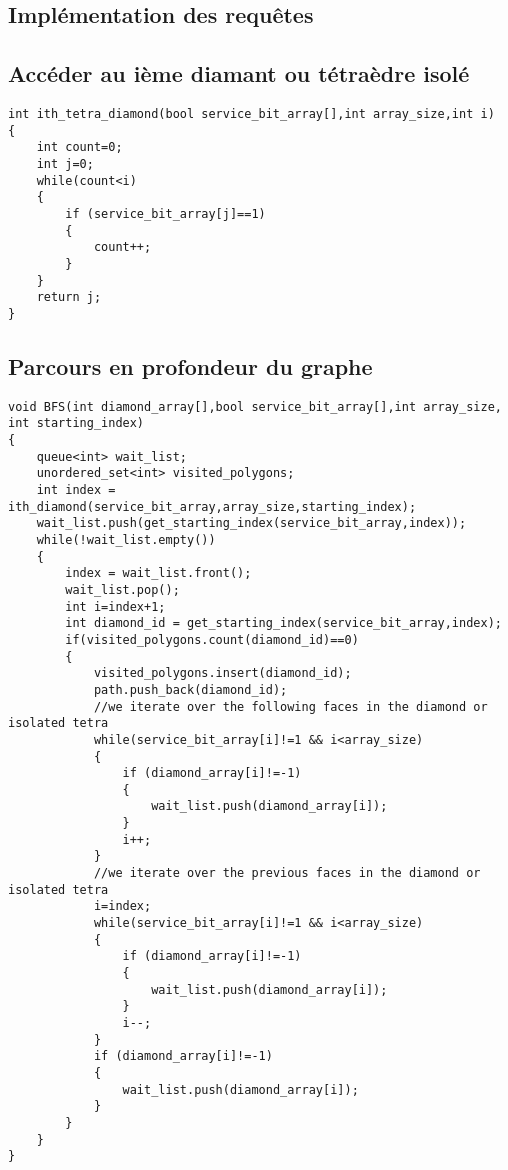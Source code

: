 \documentclass[a4paper,11pt,openany]{article}
\begin{document}
\newpage
\begin{appendices}
\section{Implémentation des requêtes}
\subsection{Accéder au ième diamant ou tétraèdre isolé}
\begin{lstlisting}
int ith_tetra_diamond(bool service_bit_array[],int array_size,int i)
{
    int count=0;
    int j=0;
    while(count<i)
    {
    	if (service_bit_array[j]==1)
    	{
    		count++;
    	}
    }
    return j;
}
\end{lstlisting}
\subsection{Parcours en profondeur du graphe}
\begin{lstlisting}
void BFS(int diamond_array[],bool service_bit_array[],int array_size,
int starting_index)
{
    queue<int> wait_list;
    unordered_set<int> visited_polygons; 
    int index = ith_diamond(service_bit_array,array_size,starting_index);    
    wait_list.push(get_starting_index(service_bit_array,index)); 
    while(!wait_list.empty())
    {
        index = wait_list.front();
        wait_list.pop();
        int i=index+1;
        int diamond_id = get_starting_index(service_bit_array,index);
        if(visited_polygons.count(diamond_id)==0)
        {
            visited_polygons.insert(diamond_id);
            path.push_back(diamond_id);
            //we iterate over the following faces in the diamond or isolated tetra
            while(service_bit_array[i]!=1 && i<array_size)
            {
                if (diamond_array[i]!=-1)
                {
                    wait_list.push(diamond_array[i]);
                }
                i++;               
            }
            //we iterate over the previous faces in the diamond or isolated tetra
            i=index;
            while(service_bit_array[i]!=1 && i<array_size)
            {
                if (diamond_array[i]!=-1)
                {
                    wait_list.push(diamond_array[i]);
                }
                i--;
            }
            if (diamond_array[i]!=-1)
            {
                wait_list.push(diamond_array[i]);
            }
        }
    }
}
\end{lstlisting}
\end{appendices}
\end{document}
